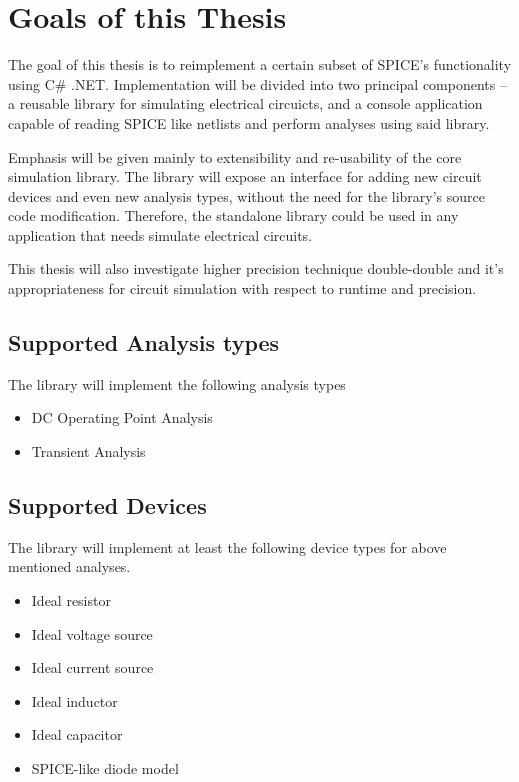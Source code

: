 \section{Goals of this Thesis}
The goal of this thesis is to reimplement a certain subset of SPICE's functionality using C\# .NET. Implementation will be divided into two principal components -- a reusable library for simulating electrical circuicts, and a console application capable of reading SPICE like netlists  and perform analyses using said library.

Emphasis will be given mainly to extensibility and re-usability of the core simulation library. The library will expose an interface for adding new circuit devices and even new analysis types, without the need for the library's source code modification. Therefore, the standalone library could be used in any application that needs simulate electrical circuits.

This thesis will also investigate higher precision technique double-double and it's appropriateness for circuit simulation with respect to runtime and precision.

\subsection{Supported Analysis types}
The library will implement the following analysis types
\begin{itemize}
	\item DC Operating Point Analysis
	\item Transient Analysis
\end{itemize}

\subsection{Supported Devices}
The library will implement at least the following device types for above mentioned analyses.
\begin{itemize}
	\item Ideal resistor
	\item Ideal voltage source
	\item Ideal current source
	\item Ideal inductor
	\item Ideal capacitor
	\item SPICE-like diode model
\end{itemize}

